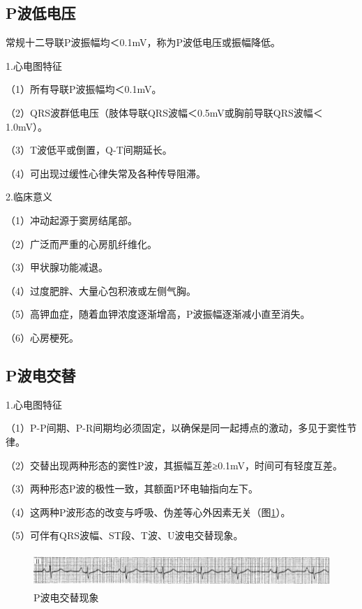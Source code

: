 \protect\hypertarget{text00007.htmlux5cux23subid13}{}{}

\subsection{P波低电压}

常规十二导联P波振幅均＜0.1mV，称为P波低电压或振幅降低。

1.心电图特征

（1）所有导联P波振幅均＜0.1mV。

（2）QRS波群低电压（肢体导联QRS波幅＜0.5mV或胸前导联QRS波幅＜1.0mV）。

（3）T波低平或倒置，Q-T间期延长。

（4）可出现过缓性心律失常及各种传导阻滞。

2.临床意义

（1）冲动起源于窦房结尾部。

（2）广泛而严重的心房肌纤维化。

（3）甲状腺功能减退。

（4）过度肥胖、大量心包积液或左侧气胸。

（5）高钾血症，随着血钾浓度逐渐增高，P波振幅逐渐减小直至消失。

（6）心房梗死。

\protect\hypertarget{text00007.htmlux5cux23subid14}{}{}

\subsection{P波电交替}

1.心电图特征

（1）P-P间期、P-R间期均必须固定，以确保是同一起搏点的激动，多见于窦性节律。

（2）交替出现两种形态的窦性P波，其振幅互差≥0.1mV，时间可有轻度互差。

（3）两种形态P波的极性一致，其额面P环电轴指向左下。

（4）这两种P波形态的改变与呼吸、伪差等心外因素无关（图\ref{fig1-14}）。

（5）可伴有QRS波幅、ST段、T波、U波电交替现象。

\begin{figure}[!htbp]
 \centering
 \includegraphics[width=5.78125in,height=0.53125in]{./images/Image00020.jpg}
 \captionsetup{justification=centering}
 \caption{P波电交替现象}
 \label{fig1-14}
  \end{figure} 

